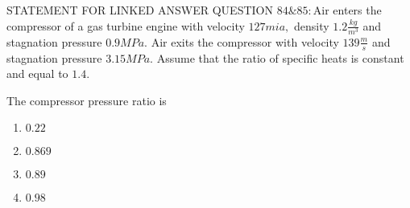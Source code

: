     STATEMENT FOR LINKED ANSWER QUESTION $84\&85:$Air enters the compressor of a gas turbine engine with velocity $127 mia,$ density $1.2 \frac{kg}{m^3}$ and stagnation pressure $0.9 MPa.$ Air exits the compressor with velocity $139 \frac{m}{s}$ and stagnation pressure $3.15 MPa.$ Assume that the ratio of specific heats is constant and equal to $1.4.$
    \item The compressor pressure ratio is
    \begin{enumerate}
        \item $0.22$
        \item $0.869$
        \item $0.89$
        \item $0.98$
    \end{enumerate}

